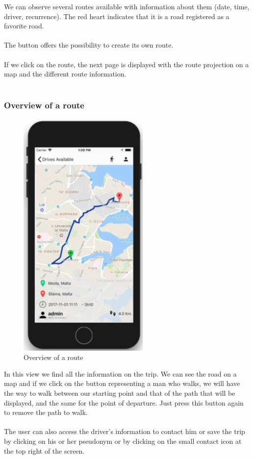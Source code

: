 We can observe several routes available with information about them (date, time, driver, recurrence). The red heart indicates that it is a road registered as a favorite road.
\\\\
The button offers the possibility to create its own route.
\\\\
If we click on the route, the next page is displayed with the route projection on a map and the different route information.
\\\\

\subsubsection{Overview of a route}

\begin{figure}[h!]
\begin{center}
\includegraphics[scale = 0.3]{diagrams/OverviewRoute.png} 
\end{center}
\caption{Overview of a route}
\end{figure}

In this view we find all the information on the trip. We can see the road on a map and if we click on the button representing a man who walks, we will have the way to walk between our starting point and that of the path that will be displayed, and the same for the point of departure. Just press this button again to remove the path to walk.
\\\\
The user can also access the driver's information to contact him or save the trip by clicking on his or her pseudonym or by clicking on the small contact icon at the top right of the screen.
\\\\

